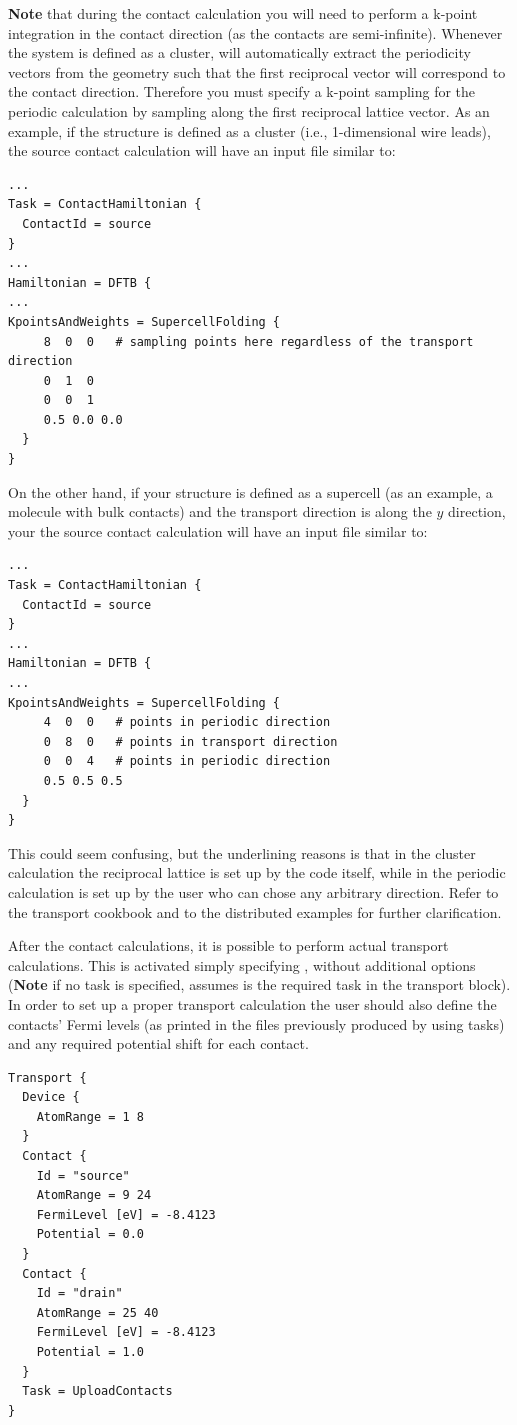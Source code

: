 {\bf Note} that during the contact calculation you will need to perform a
k-point integration in the contact direction (as the contacts are
semi-infinite).  Whenever the system is defined as a cluster, \dftbp{} will
automatically extract the periodicity vectors from the geometry such that the
first reciprocal vector will correspond to the contact direction.  Therefore you
must specify a k-point sampling for the periodic calculation by sampling along
the first reciprocal lattice vector.  As an example, if the structure is defined
as a cluster (i.e., 1-dimensional wire leads), the source contact calculation
will have an input file similar to:

\begin{verbatim}
...
Task = ContactHamiltonian {
  ContactId = source
}
...
Hamiltonian = DFTB {
...
KpointsAndWeights = SupercellFolding {
     8  0  0   # sampling points here regardless of the transport direction
     0  1  0
     0  0  1
     0.5 0.0 0.0
  }
}
\end{verbatim}

On the other hand, if your structure is defined as a supercell (as an example, a
molecule with bulk contacts) and the transport direction is along the $y$
direction, your the source contact calculation will have an input file similar
to:

\begin{verbatim}
...
Task = ContactHamiltonian {
  ContactId = source
}
...
Hamiltonian = DFTB {
...
KpointsAndWeights = SupercellFolding {
     4  0  0   # points in periodic direction
     0  8  0   # points in transport direction
     0  0  4   # points in periodic direction
     0.5 0.5 0.5
  }
}
\end{verbatim}


This could seem confusing, but the underlining reasons is that in the cluster
calculation the reciprocal lattice is set up by the code itself, while in the
periodic calculation is set up by the user who can chose any arbitrary
direction.  Refer to the transport cookbook and to the distributed examples for
further clarification.

 After the contact calculations, it is
possible to perform actual transport calculations. This is activated simply
specifying , without additional options ({\bf Note} if
no task is specified, \dftbp{} assumes  is the required task
in the transport block). In order to set up a proper transport calculation the
user should also define the contacts' Fermi levels (as printed in the files
previously produced by using  tasks) and any required
potential shift for each contact.
\begin{verbatim}
Transport {
  Device {
    AtomRange = 1 8
  }
  Contact {
    Id = "source"
    AtomRange = 9 24
    FermiLevel [eV] = -8.4123
    Potential = 0.0
  }
  Contact {
    Id = "drain"
    AtomRange = 25 40
    FermiLevel [eV] = -8.4123
    Potential = 1.0
  }
  Task = UploadContacts
}
\end{verbatim}

